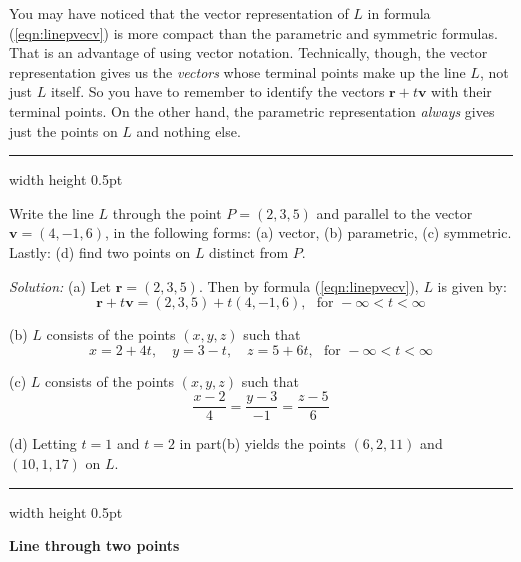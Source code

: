 You may have noticed that the vector representation of $L$ in formula (\ref{eqn:linepvecv}) is more compact than the
parametric and symmetric formulas. That is an advantage of using vector notation. Technically,
though, the vector representation gives us the \emph{vectors} whose terminal points make up the line $L$, not just $L$
itself. So you have to remember to identify the vectors $\textbf{r} + t \textbf{v}$ with their terminal points.
On the other hand, the parametric representation \emph{always} gives just the points on $L$ and nothing else.

\vspace{3mm}
\hrule width \textwidth height 0.5pt
\begin{exmp}
 Write the line $L$ through the point $P = (2,3,5)$ and parallel to the vector $\textbf{v} = (4,-1,6)$, in the
 following forms: (a) vector, (b) parametric, (c) symmetric. Lastly: (d) find two points on $L$ distinct from
 $P$.\vspace{1mm}
 \par\noindent\emph{Solution:} (a) Let $\textbf{r} = (2,3,5)$. Then by formula (\ref{eqn:linepvecv}), $L$ is given by:
 \begin{displaymath}
  \textbf{r} + t \textbf{v} = (2,3,5) + t(4,-1,6), \text{~~for~} -\infty < t < \infty
 \end{displaymath}
 \par\noindent (b) $L$ consists of the points $(x,y,z)$ such that
 \begin{displaymath}
  x = 2 + 4t, \quad y = 3 - t, \quad z = 5 + 6t, \text{~~for~} -\infty < t < \infty
 \end{displaymath}
 \par\noindent (c) $L$ consists of the points $(x,y,z)$ such that
 \begin{displaymath}
  \frac{x - 2}{4} = \frac{y - 3}{-1} = \frac{z - 5}{6}
 \end{displaymath}
 \par\noindent (d) Letting $t=1$ and $t=2$ in part(b) yields the points $(6,2,11)$ and $(10,1,17)$ on $L$.
\end{exmp}
\hrule width \textwidth height 0.5pt
\newpage
\par\noindent\textbf{\large{Line through two points}}\normalsize\vspace{1.5mm}


